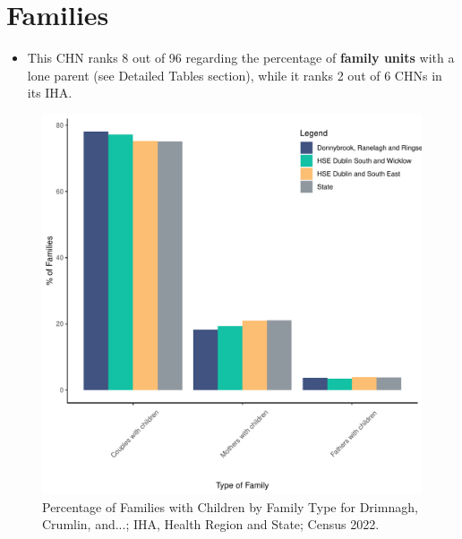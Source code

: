 \documentclass{article}
\begin{document}
\section{Families}\label{sect:Fam}
\begin{itemize}
\item This CHN ranks  8 out of 96 regarding the percentage of \textbf{family units} with a lone parent (see Detailed Tables section), while it ranks   2 out of 6 CHNs in its IHA.
\end{itemize}
\begin{figure}[H]
	\centering
	\includegraphics[width = 150mm]{../figures/FamED.pdf}
	\caption{Percentage of Families with Children by Family Type for Drimnagh, Crumlin, and...; IHA, Health Region and State; Census 2022.}
	\label{fig:vbnv}
	\end{figure}
	
\end{document}
